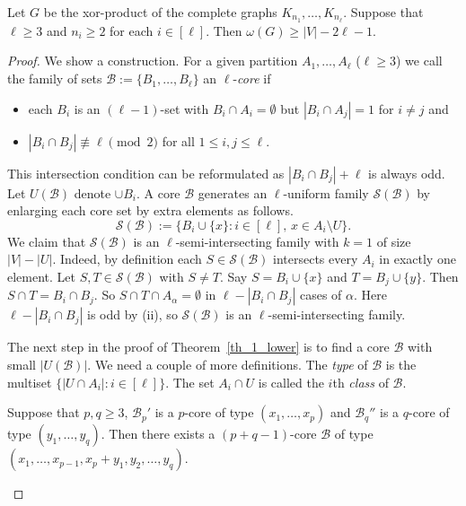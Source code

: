 \documentclass[10pt,a4paper]{amsart}
\def\cB{{\mathcal{B}}}
\def\cS{{\mathcal{S}}}
\begin{document}
\begin{Th}\label{th_1_lower}
Let $G$ be the xor-product of the complete graphs $K_{n_1}, \dots, K_{n_\ell}$.
Suppose that $\ell\geq 3$ and $n_i\geq 2$ for each $i\in [\ell]$.
Then $\omega(G)\geq |V|-2\ell-1$.
\end{Th}

\begin{proof}
We show a construction.
For a given partition $A_1, \dots, A_\ell$ ($\ell\geq 3$) we call the family of sets $\cB:=\{B_1, \dots, B_\ell\}$ an $\ell$-{\em core} if
\begin{itemize}
    \item[(i)] each $B_i$ is an $(\ell-1)$-set with $B_i\cap A_i=\emptyset$ but $|B_i\cap A_j|=1$ for $i\neq j$ and
    \item[(ii)] $|B_i\cap B_j|\not \equiv \ell \pmod 2$ for all $1\leq i,j\leq \ell$.
\end{itemize}
This intersection condition can be reformulated as $|B_i\cap B_j|+\ell$ is always odd.
Let $U(\cB)$ denote $\cup B_i$.
A core $\cB$ generates an $\ell$-uniform family $\cS(\cB)$ by enlarging each core set by extra elements as follows.
$$
   \cS(\cB):= \{ B_i\cup \{ x\}: i\in [\ell], \, x\in A_i\setminus U\}.
  $$
We claim that $\cS(\cB)$ is an $\ell$-semi-intersecting family with $k=1$ of size $|V|-|U|$.
Indeed, by definition each $S \in \cS(\cB)$ intersects every $A_i$ in exactly one element.
Let $S, T \in \cS(\cB)$ with $S \neq T$.
Say $S=B_i\cup \{ x\}$ and $T=B_j\cup \{y\}$.
Then $S\cap T= B_i\cap B_j$.
So $S\cap T\cap A_\alpha=\emptyset$ in $\ell-|B_i\cap B_j|$ cases of $\alpha$.
Here $\ell-|B_i\cap B_j|$ is odd by (ii), so $\cS(\cB)$ is an $\ell$-semi-intersecting family.

The next step in the proof of Theorem~\ref{th_1_lower} is to find a core $\cB$ with small $|U(\cB)|$.
We need a couple of more definitions.
The {\em type} of $\cB$ is the multiset $\{ |U\cap A_i|: i\in [\ell] \}$.
The set $A_i\cap U$ is called the $i$th {\em class} of $\cB$.



\begin{Lemma}\label{le:fusion}
Suppose that $p,q\geq 3$, $\cB_p'$
 is a $p$-core of type $(x_1, \dots, x_p)$ and $\cB_q''$
 is a $q$-core of type $(y_1, \dots, y_q)$. Then there exists a $(p+q-1)$-core $\cB$
 of type $(x_1, \dots, x_{p-1}, x_p+y_1, y_2, \dots, y_q)$.
\end{Lemma}



\end{proof}
\end{document}
